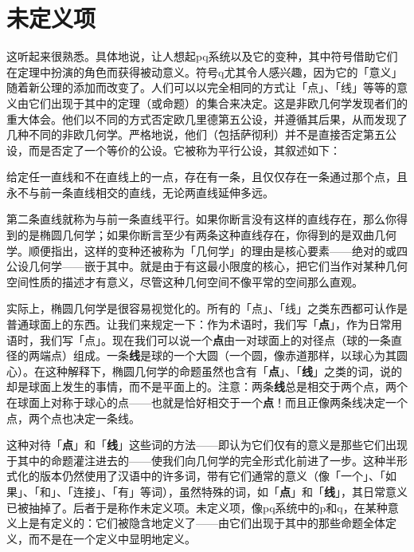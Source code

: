 \documentclass[
  12pt,
  twoside,
  openright,
  oldfontcommands,
]{memoir}
\newcommand{\heititext}[1]{{\heifamily\bfseries #1}}
\newenvironment{fsquote}{%
  \begin{mdframed}[style=gebquote]\kaitifamily\small%
}{%
  \end{mdframed}%
}
\begin{document}
\section{未定义项}

这听起来很熟悉。具体地说，让人想起pq系统以及它的变种，其中符号借助它们在定理中扮演的角色而获得被动意义。符号q尤其令人感兴趣，因为它的「意义」随着新公理的添加而改变了。人们可以以完全相同的方式让「点」、「线」等等的意义由它们出现于其中的定理（或命题）的集合来决定。这是非欧几何学发现者们的重大体会。他们以不同的方式否定欧几里德第五公设，并遵循其后果，从而发现了几种不同的非欧几何学。严格地说，他们（包括萨彻利）并不是直接否定第五公设，而是否定了一个等价的公设。它被称为平行公设，其叙述如下：

\begin{fsquote}
给定任一直线和不在直线上的一点，存在有一条，且仅仅存在一条通过那个点，且永不与前一条直线相交的直线，无论两直线延伸多远。
\end{fsquote}

第二条直线就称为与前一条直线平行。如果你断言没有这样的直线存在，那么你得到的是椭圆几何学；如果你断言至少有两条这种直线存在，你得到的是双曲几何学。顺便指出，这样的变种还被称为「几何学」的理由是核心要素------绝对的或四公设几何学------嵌于其中。就是由于有这最小限度的核心，把它们当作对某种几何空间性质的描述才有意义，尽管这种几何空间不像平常的空间那么直观。

实际上，椭圆几何学是很容易视觉化的。所有的「点」、「线」之类东西都可认作是普通球面上的东西。让我们来规定一下：作为术语时，我们写「\heititext{点}」，作为日常用语时，我们写「点」。现在我们可以说一个\heititext{点}由一对球面上的对径点（球的一条直径的两端点）组成。一条\heititext{线}是球的一个大圆（一个圆，像赤道那样，以球心为其圆心）。在这种解释下，椭圆几何学的命题虽然也含有「\heititext{点}」、「\heititext{线}」之类的词，说的却是球面上发生的事情，而不是平面上的。注意：两条\heititext{线}总是相交于两个点，两个在球面上对称于球心的点------也就是恰好相交于一个\heititext{点}！而且正像两条线决定一个点，两个点也决定一条线。

这种对待「\heititext{点}」和「\heititext{线}」这些词的方法------即认为它们仅有的意义是那些它们出现于其中的命题灌注进去的------使我们向几何学的完全形式化前进了一步。这种半形式化的版本仍然使用了汉语中的许多词，带有它们通常的意义（像「一个」、「如果」、「和」、「连接」、「有」等词），虽然特殊的词，如「\heititext{点}」和「\heititext{线}」，其日常意义已被抽掉了。后者于是称作未定义项。未定义项，像pq系统中的p和q，在某种意义上是有定义的：它们被隐含地定义了------由它们出现于其中的那些命题全体定义，而不是在一个定义中显明地定义。
\end{document}
